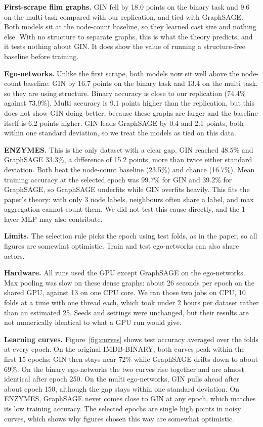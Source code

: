 \documentclass[11pt]{article}
\begin{document}
\textbf{First-scrape film graphs.} GIN fell by 18.0 points on the binary task and 9.6 on the multi task compared with our replication, and tied with GraphSAGE. Both models sit at the node-count baseline, so they learned cast size and nothing else. With no structure to separate graphs, this is what the theory predicts, and it tests nothing about GIN. It does show the value of running a structure-free baseline before training.

\textbf{Ego-networks.} Unlike the first scrape, both models now sit well above the node-count baseline: GIN by 16.7 points on the binary task and 13.4 on the multi task, so they are using structure. Binary accuracy is close to our replication (74.4\% against 73.9\%). Multi accuracy is 9.1 points higher than the replication, but this does not show GIN doing better, because these graphs are larger and the baseline itself is 6.2 points higher. GIN leads GraphSAGE by 0.4 and 2.1 points, both within one standard deviation, so we treat the models as tied on this data.

\textbf{ENZYMES.} This is the only dataset with a clear gap. GIN reached 48.5\% and GraphSAGE 33.3\%, a difference of 15.2 points, more than twice either standard deviation. Both beat the node-count baseline (23.5\%) and chance (16.7\%). Mean training accuracy at the selected epoch was 99.7\% for GIN and 39.2\% for GraphSAGE, so GraphSAGE underfits while GIN overfits heavily. This fits the paper's theory: with only 3 node labels, neighbours often share a label, and max aggregation cannot count them. We did not test this cause directly, and the 1-layer MLP may also contribute.

\textbf{Limits.} The selection rule picks the epoch using test folds, as in the paper, so all figures are somewhat optimistic. Train and test ego-networks can also share actors.

\textbf{Hardware.} All runs used the GPU except GraphSAGE on the ego-networks. Max pooling was slow on these dense graphs: about 26 seconds per epoch on the shared GPU, against 13 on one CPU core. We ran those two jobs on CPU, 10 folds at a time with one thread each, which took under 2 hours per dataset rather than an estimated 25. Seeds and settings were unchanged, but their results are not numerically identical to what a GPU run would give.

\textbf{Learning curves.} Figure~\ref{fig:curves} shows test accuracy averaged over the folds at every epoch. On the original IMDB-BINARY, both curves peak within the first 15 epochs; GIN then stays near 72\% while GraphSAGE drifts down to about 69\%. On the binary ego-networks the two curves rise together and are almost identical after epoch 250. On the multi ego-networks, GIN pulls ahead after about epoch 150, although the gap stays within one standard deviation. On ENZYMES, GraphSAGE never comes close to GIN at any epoch, which matches its low training accuracy. The selected epochs are single high points in noisy curves, which shows why figures chosen this way are somewhat optimistic.
\end{document}

